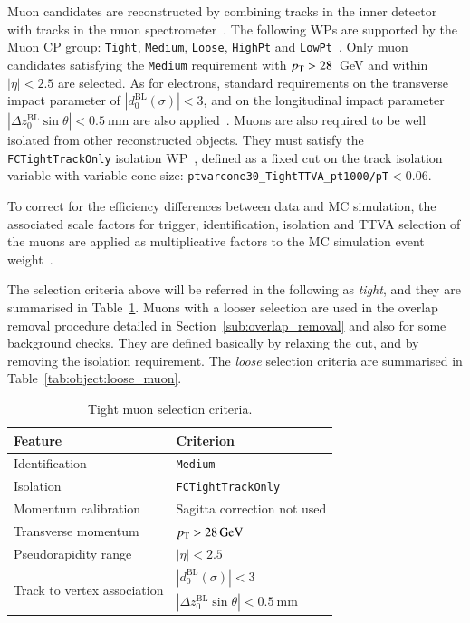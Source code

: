 %
Muon candidates are reconstructed by combining tracks in the inner detector with tracks in the muon spectrometer~\cite{Aad:2020gmm}. The following WPs are supported by the Muon CP group:   \texttt{Tight},  \texttt{Medium},  \texttt{Loose},  \texttt{HighPt} and  \texttt{LowPt}~\cite{twiki:MuonSelectionTool}. Only muon candidates satisfying the \texttt{Medium} requirement  with $ p_{\text{T}} > 28$~GeV and within $|\eta|<2.5$ are selected.   As for electrons, standard requirements on the transverse impact parameter of $|d_{0}^{\text{BL}}(\sigma)| < 3$,  and on the longitudinal impact parameter  $|\Delta z_{0}^{\text{BL}} \sin{\theta}| < \SI[parse-numbers=false]{0.5}{\mm}$ are also applied~\cite{twiki:FinalTrackingRecommendations}. Muons are also required to be well isolated from other reconstructed objects. They must satisfy the \texttt{FCTightTrackOnly}  isolation WP~\cite{twiki:IsolationSelectionTool}, defined as a fixed cut on the track isolation variable with variable cone size:  \texttt{ptvarcone30\_TightTTVA\_pt1000/pT}$<0.06$.  


To correct for the efficiency differences between data and MC simulation, the associated scale factors for trigger, identification, isolation and TTVA selection of the muons are applied as multiplicative factors to the MC simulation event weight~\cite{twiki:FMCPAnalysisGuidelinesMC16}. 

The selection criteria above will be referred in the following as \textit{tight}, and they are summarised in Table~\ref{tab:object:muon}. Muons with a looser selection are used in the overlap removal procedure detailed in Section~\ref{sub:overlap_removal} and also for some background checks. They are defined basically by relaxing the \pT cut, and by removing the isolation requirement. The \textit{loose} selection criteria are summarised in Table~\ref{tab:object:loose_muon}.

\begin{table}[ht]
  \caption{Tight muon selection criteria.}%
  \label{tab:object:muon}
  \centering
  \begin{tabular}[ht]{ll}
    \toprule
    Feature & Criterion \\
    \midrule
    Identification & \texttt{Medium} \\
    Isolation  & \texttt{FCTightTrackOnly}\\
    Momentum calibration & Sagitta correction not used \\
    Transverse momentum& \(\pT > \SI[parse-numbers=false]{28}{\GeV}\) \\
     Pseudorapidity range &  \(|\eta| < 2.5\) \\
     \midrule
    \multirow{2}{*}{Track to vertex association}&  \(|d_{0}^{\text{BL}}(\sigma)| < 3\)  \\
    & \(|\Delta z_{0}^{\text{BL}} \sin{\theta}| < \SI[parse-numbers=false]{0.5}{\mm}\) \\
    \bottomrule
  \end{tabular}
\end{table}


